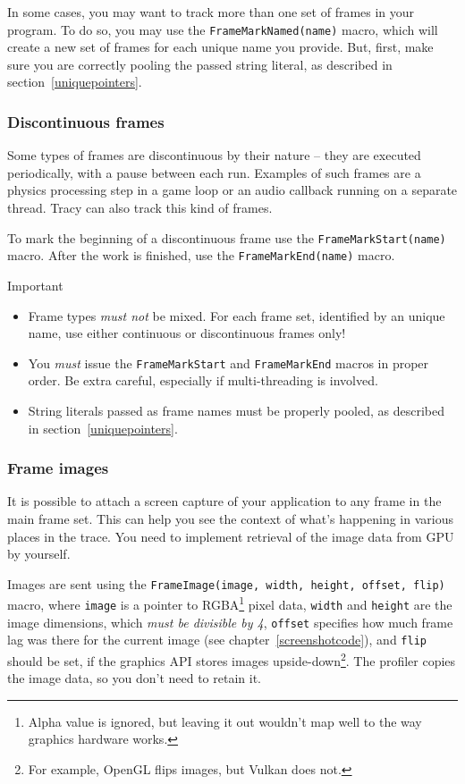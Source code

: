 \documentclass[hidelinks,titlepage,a4paper,twoside]{article}
\begin{document}
In some cases, you may want to track more than one set of frames in your program. To do so, you may use the \texttt{FrameMarkNamed(name)} macro, which will create a new set of frames for each unique name you provide. But, first, make sure you are correctly pooling the passed string literal, as described in section~\ref{uniquepointers}.

\subsubsection{Discontinuous frames}

Some types of frames are discontinuous by their nature -- they are executed periodically, with a pause between each run. Examples of such frames are a physics processing step in a game loop or an audio callback running on a separate thread. Tracy can also track this kind of frames.

To mark the beginning of a discontinuous frame use the \texttt{FrameMarkStart(name)} macro. After the work is finished, use the \texttt{FrameMarkEnd(name)} macro.

\begin{bclogo}[
noborder=true,
couleur=black!5,
logo=\bcbombe
]{Important}
\begin{itemize}
\item Frame types \emph{must not} be mixed. For each frame set, identified by an unique name, use either continuous or discontinuous frames only!
\item You \emph{must} issue the \texttt{FrameMarkStart} and \texttt{FrameMarkEnd} macros in proper order. Be extra careful, especially if multi-threading is involved.
\item String literals passed as frame names must be properly pooled, as described in section~\ref{uniquepointers}.
\end{itemize}
\end{bclogo}

\subsubsection{Frame images}
\label{frameimages}

It is possible to attach a screen capture of your application to any frame in the main frame set. This can help you see the context of what's happening in various places in the trace. You need to implement retrieval of the image data from GPU by yourself.

Images are sent using the \texttt{FrameImage(image, width, height, offset, flip)} macro, where \texttt{image} is a pointer to RGBA\footnote{Alpha value is ignored, but leaving it out wouldn't map well to the way graphics hardware works.} pixel data, \texttt{width} and \texttt{height} are the image dimensions, which \emph{must be divisible by 4}, \texttt{offset} specifies how much frame lag was there for the current image (see chapter~\ref{screenshotcode}), and \texttt{flip} should be set, if the graphics API stores images upside-down\footnote{For example, OpenGL flips images, but Vulkan does not.}. The profiler copies the image data, so you don't need to retain it.
\end{document}
